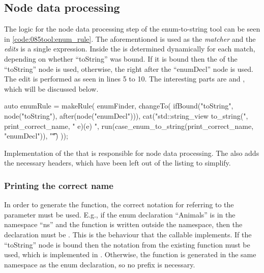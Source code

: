 \subsection{Node data processing}
The logic for the node data processing step of the enum-to-string tool can be seen in \cref{code:085tool:enum_rule}.
The aforementioned  is used as the \textit{matcher} and the \textit{edits} is a single  expression.
Inside  the  is determined dynamically for each match, depending on whether ``toString'' was bound. If it is bound then the  of the ``toString'' node is used, otherwise, the  right after the ``enumDecl'' node is used.
The edit is performed as seen in lines 5 to 10. The interesting parts are  and , which will be discussed below.

\begin{listing}[H]
    \begin{cppcode}
auto enumRule = makeRule(
    enumFinder,
    changeTo(
        ifBound("toString", node("toString"), after(node("enumDecl"))),
        cat("\n\nconstexpr std::string_view to_string(",
            print_correct_name,
            " e){\n\tswitch(e) {\n",
            run(case_enum_to_string(print_correct_name, "enumDecl")),
            "\t}\n}")
    ));
    \end{cppcode}
    \caption{Implementation of the  that is responsible for node data processing. The  also adds the necessary headers, which have been left out of the listing to simplify.}
    \label{code:085tool:enum_rule}
\end{listing}

\subsubsection*{Printing the correct name}
In order to generate the  function, the correct notation for referring to the parameter must be used. E.g., if the enum declaration ``Animals'' is in the namespace ``ns'' and the  function is written outside the namespace, then the declaration must be .
This is the behaviour that the callable  implements.
If the ``toString'' node is bound then the notation from the existing  function must be used, which is implemented in  
.
Otherwise, the  function is generated in the same namespace as the enum declaration, so no prefix is necessary.

